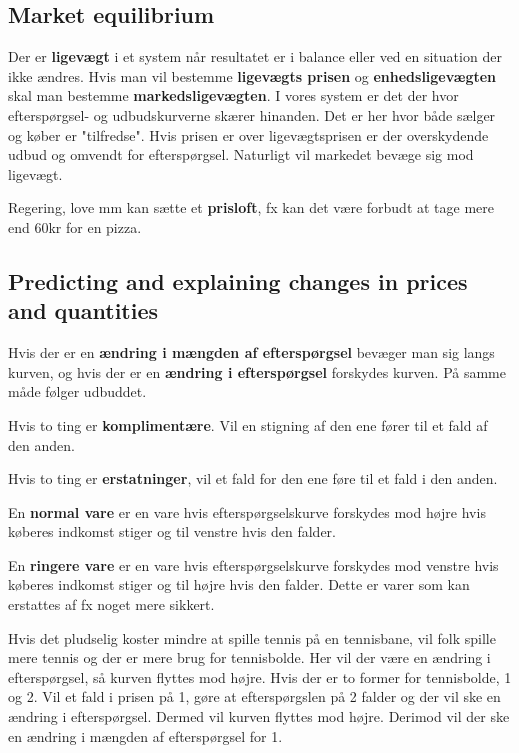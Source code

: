 \subsection{Market equilibrium}
Der er \textbf{ligevægt} i et system når resultatet er i balance eller ved en situation der ikke ændres. Hvis man vil bestemme \textbf{ligevægts prisen} og \textbf{enhedsligevægten} skal man bestemme \textbf{markedsligevægten}. I vores system er det der hvor efterspørgsel- og udbudskurverne skærer hinanden. Det er her hvor både sælger og køber er "tilfredse". Hvis prisen er over ligevægtsprisen er der overskydende udbud og omvendt for efterspørgsel. Naturligt vil markedet bevæge sig mod ligevægt.

Regering, love mm kan sætte et \textbf{prisloft}, fx kan det være forbudt at tage mere end 60kr for en pizza. 

\subsection{Predicting and explaining changes in prices and quantities}
Hvis der er en \textbf{ændring i mængden af efterspørgsel} bevæger man sig langs kurven, og hvis der er en \textbf{ændring i efterspørgsel} forskydes kurven. På samme måde følger udbuddet. 

Hvis to ting er \textbf{komplimentære}. Vil en stigning af den ene fører til et fald af den anden.

Hvis to ting er \textbf{erstatninger}, vil et fald for den ene føre til et fald i den anden.

En \textbf{normal vare} er en vare hvis efterspørgselskurve forskydes mod højre hvis køberes indkomst stiger og til venstre hvis den falder. 

En \textbf{ringere vare} er en vare hvis efterspørgselskurve forskydes mod venstre hvis køberes indkomst stiger og til højre hvis den falder. Dette er varer som kan erstattes af fx noget mere sikkert. 

\begin{eks} \textbf{} %
\newline
Hvis det pludselig koster mindre at spille tennis på en tennisbane, vil folk spille mere tennis og der er mere brug for tennisbolde. Her vil der være en ændring i efterspørgsel, så kurven flyttes mod højre. Hvis der er to former for tennisbolde, 1 og 2. Vil et fald i prisen på 1, gøre at efterspørgslen på 2 falder og der vil ske en ændring i efterspørgsel. Dermed vil kurven flyttes mod højre. Derimod vil der ske en ændring i mængden af efterspørgsel for 1. 
\end{eks}


